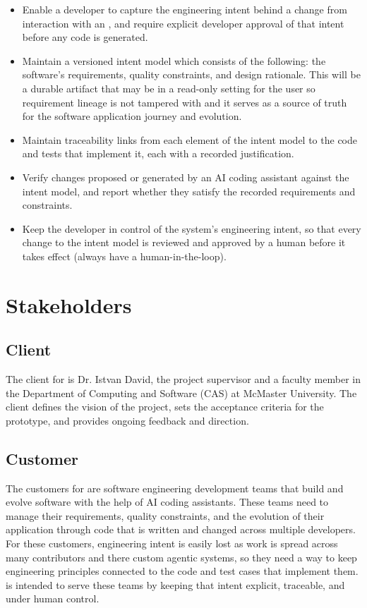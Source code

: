 \documentclass[12pt]{article}
\begin{document}
\begin{itemize}
  \item[\textbf{G1}:] Enable a developer to capture the engineering intent
  behind a change from interaction with an \progname{},
  and require explicit developer approval of that intent before any code is
  generated.
  \item[\textbf{G2}:] Maintain a versioned intent model which consists of the following: the software's
  requirements, quality constraints, and design rationale. This will be a durable artifact that may be in a read-only 
  setting for the user so requirement lineage is not tampered with and it serves as a source of truth for the software application journey and evolution. 
  \item[\textbf{G3}:] Maintain traceability links from each element of the
  intent model to the code and tests that implement it, each with a recorded
  justification.
  \item[\textbf{G4}:] Verify changes proposed or generated by an AI coding
  assistant against the intent model, and report whether they satisfy the
  recorded requirements and constraints.
  \item[\textbf{G5}:] Keep the developer in control of the system's engineering
  intent, so that every change to the intent model is reviewed and approved by a
  human before it takes effect (always have a human-in-the-loop). 
\end{itemize}
\section{Stakeholders}
\subsection{Client}

The client for \progname{} is Dr. Istvan David, the project supervisor and a
faculty member in the Department of Computing and Software (CAS) at McMaster
University. The client defines the vision of the project, sets the
acceptance criteria for the prototype, and provides ongoing feedback and direction. 

\subsection{Customer}

The customers for \progname{} are software engineering development teams that
build and evolve software with the help of AI coding assistants. These teams
need to manage their requirements, quality constraints, and the evolution of
their application through code that is written and changed across multiple
developers. For these customers, engineering intent is easily lost as work is
spread across many contributors and there custom agentic systems, so they need a way
to keep engineering principles connected to the code and test cases that implement them. 
\progname{} is intended to serve these teams by keeping that intent explicit, traceable, and under human control.
\end{document}
